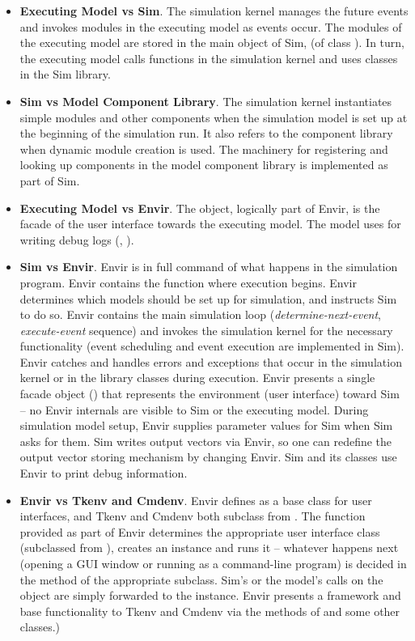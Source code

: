 \begin{itemize}
  \item{\textbf{Executing Model vs Sim}. The simulation kernel
    manages the future events and invokes modules in the executing model
    as events occur. The modules of the executing model are stored
    in the main object of Sim,  (of class ).
    In turn, the executing model calls functions in the
    simulation kernel and uses classes in the Sim library.}
  \item{\textbf{Sim vs Model Component Library}. The simulation kernel
    instantiates simple modules and other components when the simulation model
    is set up at the beginning of the simulation run. It also refers
    to the component library when dynamic module creation is used.
    The machinery for registering and looking up components in the model
    component library is implemented as part of Sim.}
  \item{\textbf{Executing Model vs Envir}. The  object, logically
    part of Envir, is the facade of the user interface towards the executing model.
    The model uses  for writing debug logs (, ).}
  \item{\textbf{Sim vs Envir}. Envir is in full command of what
    happens in the simulation program. Envir contains the  function
    where execution begins. Envir determines which models should be set up
    for simulation, and instructs Sim to do so. Envir contains the main
    simulation loop (\textit{determine-next-event}, \textit{execute-event}
    sequence) and invokes the simulation kernel for the necessary
    functionality (event scheduling and event execution are implemented in Sim).
    Envir catches and handles errors and exceptions that occur
    in the simulation kernel or in the library
    classes during execution. Envir presents a single facade object ()
    that represents the environment (user interface) toward Sim -- no Envir
    internals are visible to Sim or the executing model.
    During simulation model setup, Envir supplies parameter values for
    Sim when Sim asks for them. Sim writes output vectors via Envir,
    so one can redefine the output vector storing mechanism by changing Envir.
    Sim and its classes use Envir to print debug information.}
  \item{\textbf{Envir vs Tkenv and Cmdenv}. Envir defines 
    as a base class for user interfaces, and Tkenv and Cmdenv both subclass
    from . The  function provided as part of Envir
    determines the appropriate user interface class (subclassed from
    ), creates an instance and runs it -- whatever
    happens next (opening a GUI window or running as a command-line program)
    is decided in the  method of the appropriate 
    subclass. Sim's or the model's calls on the  object are
    simply forwarded to the  instance. Envir presents
    a framework and base functionality to Tkenv and Cmdenv via the methods of
      and some other classes.)}
\end{itemize}


